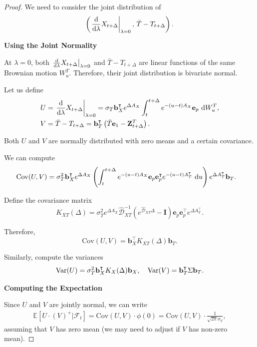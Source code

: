\documentclass[10pt,a4paper,reqno]{amsart}
\theoremstyle{example}
\newcommand{\Cov}{\mathrm{Cov}}
\newcommand*\D{\mathop{}\!\textnormal{d}}
\newcommand{\Var}{\textnormal{Var}}
\begin{document}
\begin{proof}
We need to consider the joint distribution of
\[
\left( \left. \frac{\D}{\D \lambda} X_{t+\Delta} \right|_{\lambda = 0}, \, \bar{T} - T_{t+\Delta} \right).
\]

\textbf{Using the Joint Normality}

At $\lambda = 0$, both $\left. \frac{\D}{\D \lambda} X_{t+\Delta} \right|_{\lambda = 0}$ and $\bar{T} - T_{t+\Delta}$ are linear functions of the same Brownian motion $W_u^T$. Therefore, their joint distribution is bivariate normal.

Let us define
\begin{align}
U &= \left. \frac{\D}{\D \lambda} X_{t+\Delta} \right|_{\lambda = 0} = \sigma_T \mathbf{b}_X^\intercal e^{\Delta A_X} \int_t^{t+\Delta} e^{-(u - t) A_X} \mathbf{e}_p \, \D W_u^T, \\
V &= \bar{T} - T_{t+\Delta} = \mathbf{b}_T^\intercal \left( \bar{T} \mathbf{e}_1 - \mathbf{Z}_{t+\Delta}^T \right).
\end{align}

Both $U$ and $V$ are normally distributed with zero means and a certain covariance.

We can compute
\begin{align}
\Cov(U, V) &= \sigma_T^2 \mathbf{b}_X^\intercal e^{\Delta A_X} \left( \int_t^{t+\Delta} e^{-(u - t) A_X} \mathbf{e}_p \mathbf{e}_p^\intercal e^{-(u - t) A_T^\intercal} \, \D u \right) e^{\Delta A_T^\intercal} \mathbf{b}_T.
\end{align}

Define the covariance matrix
\[
K_{XT}(\Delta) = \sigma_T^2 e^{\Delta A_X} \hat{\mathcal{D}}_{XT}^{-1} \left( e^{\hat{\mathcal{D}}_{XT} \Delta} - \mathbf{I} \right) \mathbf{e}_p \mathbf{e}_p^\intercal e^{\Delta A_T^\intercal}.
\]

Therefore,
\[
\Cov(U, V) = \mathbf{b}_X^\intercal K_{XT}(\Delta) \mathbf{b}_T.
\]

Similarly, compute the variances
\[
\Var(U) = \sigma_T^2 \mathbf{b}_X^\intercal K_X(\Delta) \mathbf{b}_X, \quad \Var(V) = \mathbf{b}_T^\intercal \Sigma \mathbf{b}_T.
\]

\textbf{Computing the Expectation}

Since $U$ and $V$ are jointly normal, we can write
\begin{align}
\mathbb{E} \left[ U \cdot (V)^+ \bigg| \mathcal{F}_t \right] = \Cov(U, V) \cdot \phi\left( 0 \right) = \Cov(U, V) \cdot \frac{1}{\sqrt{2\pi} \sigma_V},
\end{align}
assuming that $V$ has zero mean (we may need to adjust if $V$ has non-zero mean).


\end{proof}
\end{document}
